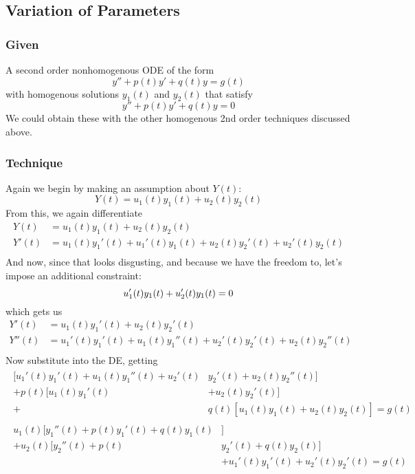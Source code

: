 \documentclass[11pt]{article}
\begin{document}
\subsection{Variation of Parameters}
\subsubsection{Given}
A second order nonhomogenous ODE of the form
    \[ y'' + p(t)y' + q(t)y = g(t) \]
with homogenous solutions $y_1(t)$ and $y_2(t)$ that satisfy
    \[ y'' + p(t)y' + q(t)y = 0 \]
We could obtain these with the other homogenous 2nd order techniques discussed above. 
\subsubsection{Technique}
Again we begin by making an assumption about $Y(t)$: 
    \[ Y(t) = u_1(t)y_1(t) + u_2(t)y_2(t) \]
From this, we again differentiate
\begin{align*}
    Y(t) &= u_1(t)y_1(t) + u_2(t)y_2(t) \\
    Y'(t) &= u_1(t)y_1'(t) + u_1'(t)y_1(t) + u_2(t)y_2'(t) + u_2'(t)y_2(t) \\
\end{align*}
And now, since that looks disgusting, and because we have the freedom to, let's impose an additional constraint:
\begin{equation}
u_1'(t)y_1(t) + u_2'(t)y_1(t) = 0  \\
\end{equation}
which gets us
\begin{align*}
    Y'(t) &= u_1(t)y_1'(t) + u_2(t)y_2'(t)\\
    Y''(t) &= u_1'(t)y_1'(t) + u_1(t)y_1''(t) + u_2'(t)y_2'(t) + u_2(t)y_2''(t) \\
\end{align*}
Now substitute into the DE, getting
\begin{eqnarray*}
\begin{split}
    [ u_1'(t)y_1'(t) + u_1(t)y_1''(t) + u_2'(t)&y_2'(t) + u_2(t)y_2''(t)] \\
    + p(t)[ u_1(t)y_1'(t) &+ u_2(t)y_2'(t)]  \\
    + &q(t)\left[ u_1(t)y_1(t) + u_2(t)y_2(t) \right] = g(t)
\end{split}
\end{eqnarray*}
\begin{eqnarray*}
\begin{split}
   u_1(t)[y_1''(t) + p(t)y_1'(t) + q(t)y_1(t)&] \\
   + u_2(t)[y_2''(t) + p(t)&y_2'(t) + q(t)y_2(t)] \\
   &+ u_1'(t)y_1'(t) + u_2'(t)y_2'(t) = g(t)
\end{split}
\end{eqnarray*}
\end{document}
